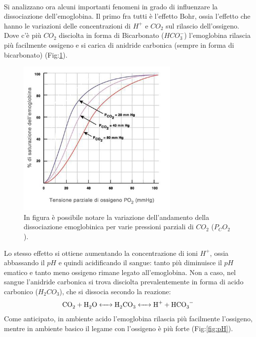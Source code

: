 \documentclass[a4paper, 12pt]{book}
\begin{document}
\\Si analizzano ora alcuni importanti fenomeni in grado di influenzare la dissociazione dell'emoglobina.
Il primo fra tutti è l'effetto Bohr, ossia l'effetto che hanno le variazioni delle concentrazioni di $H^+$ e $CO_2$ sul rilascio dell'ossigeno.
Dove c'è più $CO_2$ disciolta in forma di Bicarbonato ($HCO_3^-$) l'emoglobina rilascia più facilmente ossigeno e si carica di anidride carbonica (sempre in forma di bicarbonato) (Fig:\ref{fig:CO2}).
\begin{figure}[h!]
    \centering
    \includegraphics[width=0.7\textwidth]{emoglobina-C02.jpeg}
    \caption{In figura è possibile notare la variazione dell'andamento della 	 		 			 dissociazione emoglobinica per varie pressioni parziali di $CO_2$ 							 ($P_CO_2$).}
    \label{fig:CO2}
\end{figure}
Lo stesso effetto si ottiene aumentando la concentrazione di ioni $H^+$, ossia abbassando il $pH$ e quindi acidificando il sangue: tanto più diminuisce il $pH$ ematico e tanto meno ossigeno rimane legato all'emoglobina.
Non a caso, nel sangue l'anidride carbonica si trova disciolta prevalentemente in forma di acido carbonico ($H_2CO_3$), che si dissocia secondo la reazione:
\begin{equation*}
    \ce{CO_2 + H_2O <-> H_2CO_3 <-> H^+ + HCO_3^-}
\end{equation*}
Come anticipato, in ambiente acido l'emoglobina rilascia più facilmente l'ossigeno, mentre in ambiente basico il legame con l'ossigeno è più forte (Fig:\ref{fig:pH}).
\end{document}
